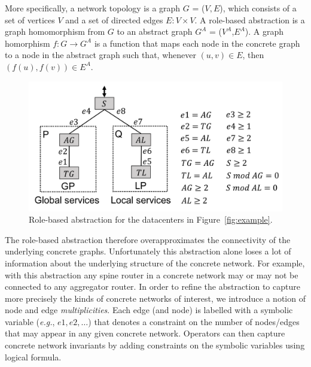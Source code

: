 \documentclass{sig-alternate-10pt}
\newcommand{\EG}{\emph{e.g.}}
\begin{document}
More specifically, a network topology is a graph $G$ = ($V, E$), which consists of a set of vertices $V$ and a set of directed edges $E \colon V \times V$. A role-based abstraction is a graph homomorphism from $G$ to an abstract graph $G^A$ = ($V^A$,$E^A$). A graph homorphism $f : G \rightarrow G^A$ is a function that maps each node in the concrete graph to a node in the abstract graph such that, whenever $(u,v) \in E$, then $(f(u),f(v)) \in E^A$.


\begin{figure}[t!]
  \centering
  \includegraphics[width=\columnwidth]{figures/example3}
  \caption{Role-based abstraction for the datacenters in Figure~\ref{fig:example}.}
  \label{fig:example3}
  \vspace{-1em}
\end{figure}

The role-based abstraction therefore overapproximates the connectivity of the underlying concrete graphs. Unfortunately this abstraction alone loses a lot of information about the underlying structure of the concrete network. For example, with this abstraction any spine router in a concrete network may or may not be connected to any aggregator router.
%
In order to refine the abstraction to capture more precisely the kinds of concrete networks of interest,
we introduce a notion of node and edge \emph{multiplicities}. Each edge (and node) is labelled
with a symbolic variable (\EG, $e1, e2, \ldots$) that denotes a constraint on the number of nodes/edges
that may appear in any given concrete network. Operators can then capture concrete network invariants by adding constraints on the symbolic variables using logical formula.
\end{document}

